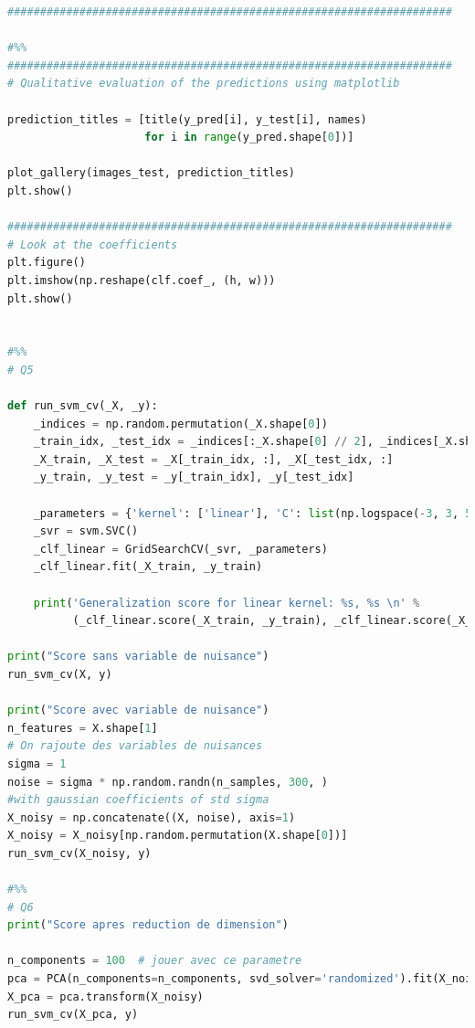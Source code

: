 \documentclass{book}
\begin{document}
\begin{lstlisting}[language=Python, caption=Code python complet]
####################################################################

#%%
####################################################################
# Qualitative evaluation of the predictions using matplotlib

prediction_titles = [title(y_pred[i], y_test[i], names)
                     for i in range(y_pred.shape[0])]

plot_gallery(images_test, prediction_titles)
plt.show()

####################################################################
# Look at the coefficients
plt.figure()
plt.imshow(np.reshape(clf.coef_, (h, w)))
plt.show()


#%%
# Q5

def run_svm_cv(_X, _y):
    _indices = np.random.permutation(_X.shape[0])
    _train_idx, _test_idx = _indices[:_X.shape[0] // 2], _indices[_X.shape[0] // 2:]
    _X_train, _X_test = _X[_train_idx, :], _X[_test_idx, :]
    _y_train, _y_test = _y[_train_idx], _y[_test_idx]

    _parameters = {'kernel': ['linear'], 'C': list(np.logspace(-3, 3, 5))}
    _svr = svm.SVC()
    _clf_linear = GridSearchCV(_svr, _parameters)
    _clf_linear.fit(_X_train, _y_train)

    print('Generalization score for linear kernel: %s, %s \n' %
          (_clf_linear.score(_X_train, _y_train), _clf_linear.score(_X_test, _y_test)))

print("Score sans variable de nuisance")
run_svm_cv(X, y)

print("Score avec variable de nuisance")
n_features = X.shape[1]
# On rajoute des variables de nuisances
sigma = 1
noise = sigma * np.random.randn(n_samples, 300, ) 
#with gaussian coefficients of std sigma
X_noisy = np.concatenate((X, noise), axis=1)
X_noisy = X_noisy[np.random.permutation(X.shape[0])]
run_svm_cv(X_noisy, y)

#%%
# Q6
print("Score apres reduction de dimension")

n_components = 100  # jouer avec ce parametre
pca = PCA(n_components=n_components, svd_solver='randomized').fit(X_noisy)
X_pca = pca.transform(X_noisy)
run_svm_cv(X_pca, y)

\end{lstlisting}
\end{document}
